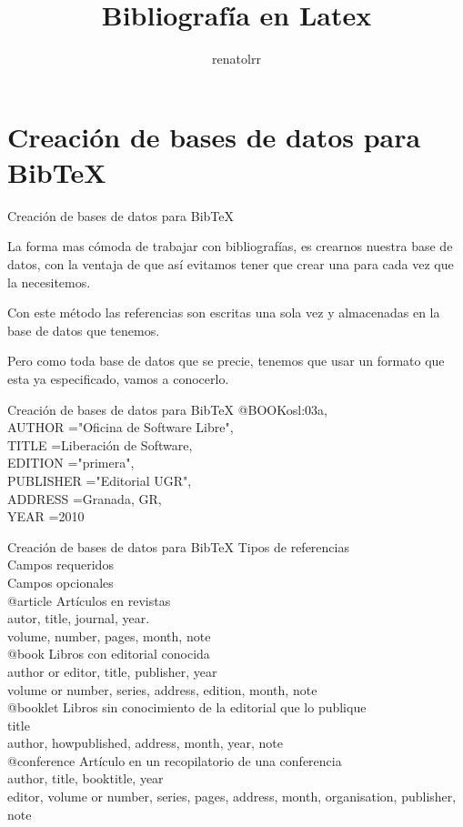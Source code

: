 \documentclass[9pt]{beamer}
\author{renatolrr}
\title{Bibliografía en Latex}
\date{}
\begin{document}
\begin{frame}
\titlepage
\end{frame}

\begin{frame}
\tableofcontents
\end{frame}
\section{Creación de bases de datos para BibTeX}
\begin{frame}{Creación de bases de datos para BibTeX}

La forma mas cómoda de trabajar con bibliografías, es crearnos nuestra base de datos, con la ventaja de que así evitamos tener que crear una para cada vez que la necesitemos.

Con este método las referencias son escritas una sola vez y almacenadas en la base de datos que tenemos.

Pero como toda base de datos que se precie, tenemos que usar un formato que esta ya especificado, vamos a conocerlo.
\end{frame}

\begin{frame}{Creación de bases de datos para BibTeX}
@BOOK{osl:03a,\\ 	
AUTHOR 	="Oficina de Software Libre",\\
TITLE 	={Liberación de Software},\\
EDITION 	="primera",\\
PUBLISHER 	="Editorial UGR",\\
ADDRESS 	={Granada, GR},\\
YEAR 	=2010 }\\
\end{frame}

\begin{frame}{Creación de bases de datos para BibTeX}
Tipos de referencias\\
Campos requeridos\\
Campos opcionales\\

@article Artículos en revistas\\
	autor, title, journal, year.\\
	volume, number, pages, month, note\\
@book Libros con editorial conocida\\
 	author or editor, title, publisher, year\\
	volume or number, series, address, edition, month, note\\
@booklet Libros sin conocimiento de la editorial que lo publique\\
	title\\
	author, howpublished, address, month, year, note\\
@conference Artículo en un recopilatorio de una conferencia\\
	author, title, booktitle, year\\
	editor, volume or number, series, pages, address, month, organisation, publisher, note\\
\end{frame}
\end{document}
